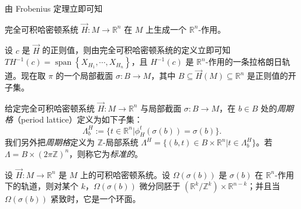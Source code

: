 
由 Frobenius 定理立即可知

\begin{corollary*}
完全可积哈密顿系统 $\vec{H}\colon M\to\mathbb{R}^n$ 在 $M$ 上生成一个 $\mathbb{R}^n$-作用。
\end{corollary*}

{\sloppy 设 $c$ 是 $\vec{H}$ 的正则值，则由完全可积哈密顿系统的定义立即可知 $TH^{-1} (c)=\operatorname{span}\left\{X_{H_1},\dotsb,X_{H_n}\right\}$，且 $H^{-1} (c)$ 是 $\mathbb{R}^n$-作用的一条拉格朗日轨道。现在取 $\pi$ 的一个局部截面 $\sigma\colon B\to M$，其中 $B\subseteq\vec{H}(M)\subseteq\mathbb{R}^n$ 是正则值的开子集。\par}


\begin{definition*}
给定完全可积哈密顿系统 $\vec{H}\colon M\to\mathbb{R}^n$ 与局部截面 $\sigma\colon B\to M$，在 $b\in B$ 处的\emph{周期格}（period lattice）定义为如下子集：
\[
  \Lambda_b^H :=\{t\in\mathbb{R}^n\vert \phi_H^t (\sigma (b))=\sigma (b)\}.
\]
我们另外把\emph{周期格}定义为 $\mathbb{Z}$-局部系统 $\Lambda^H =\{(b,t)\in B\times\mathbb{R}^n\vert t\in\Lambda_b^H\}$。若 $\Lambda =B\times (2\pi\mathbb{Z})^n$，则称它为\emph{标准的}。
\end{definition*}


\begin{theorem*}
设 $\vec{H}\colon M\to\mathbb{R}^n$ 是 $M$ 上的可积哈密顿系统。设 $\Omega (\sigma (b))$ 是 $\sigma (b)$ 在 $\mathbb{R}^n$-作用下的轨道，则对某个 $k$，$\Omega (\sigma (b))$ 微分同胚于 $\displaystyle\left(\mathbb{R}^k/\mathbb{Z}^k\right)\times\mathbb{R}^{n-k}$；并且当 $\Omega (\sigma (b))$ 紧致时，它是一个环面。
\end{theorem*}


